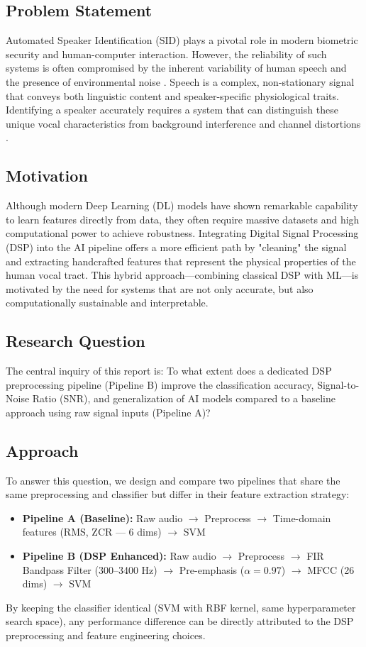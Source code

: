
\subsection{Problem Statement}
Automated Speaker Identification (SID) plays a pivotal role in modern biometric security and human-computer interaction. However, the reliability of such systems is often compromised by the inherent variability of human speech and the presence of environmental noise . Speech is a complex, non-stationary signal that conveys both linguistic content and speaker-specific physiological traits. Identifying a speaker accurately requires a system that can distinguish these unique vocal characteristics from background interference and channel distortions .
\subsection{Motivation}
Although modern Deep Learning (DL) models have shown remarkable capability to learn features directly from data, they often require massive datasets and high computational power to achieve robustness. Integrating Digital Signal Processing (DSP) into the AI pipeline offers a more efficient path by "cleaning" the signal and extracting handcrafted features that represent the physical properties of the human vocal tract. This hybrid approach—combining classical DSP with ML—is motivated by the need for systems that are not only accurate, but also computationally sustainable and interpretable.
\subsection{Research Question}
The central inquiry of this report is: To what extent does a dedicated DSP preprocessing pipeline (Pipeline B) improve the classification accuracy, Signal-to-Noise Ratio (SNR), and generalization of AI models compared to a baseline approach using raw signal inputs (Pipeline A)?

\subsection{Approach}
To answer this question, we design and compare two pipelines that share the same preprocessing and classifier but differ in their feature extraction strategy:

\begin{itemize}
    \item \textbf{Pipeline A (Baseline):} Raw audio $\rightarrow$ Preprocess $\rightarrow$ Time-domain features (RMS, ZCR --- 6 dims) $\rightarrow$ SVM
    \item \textbf{Pipeline B (DSP Enhanced):} Raw audio $\rightarrow$ Preprocess $\rightarrow$ FIR Bandpass Filter (300--3400 Hz) $\rightarrow$ Pre-emphasis ($\alpha = 0.97$) $\rightarrow$ MFCC (26 dims) $\rightarrow$ SVM
\end{itemize}

\noindent By keeping the classifier identical (SVM with RBF kernel, same hyperparameter search space), any performance difference can be directly attributed to the DSP preprocessing and feature engineering choices.